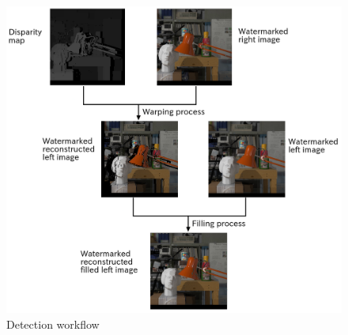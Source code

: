 \begin{figure}[h!]
\centering
\includegraphics[width=1\textwidth]{./img/detection_workflow.png}
\caption{\small{Detection workflow}}
\label{fig:detflow}
\end{figure}

